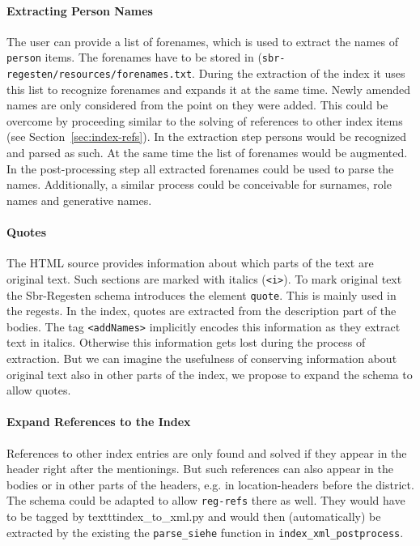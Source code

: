 \paragraph{Extracting Person Names}
The user can provide a list of forenames, which is used to extract the names of \texttt{person} items. The forenames have to be stored in (\texttt{sbr-regesten/resources/forenames.txt}. During the extraction of the index it uses this list to recognize forenames and expands it at the same time. Newly amended names are only considered from the point on they were added. This could be overcome by proceeding similar to the solving of references to other index items (see Section~\ref{sec:index-refs}). In the extraction step persons would be recognized and parsed as such. At the same time the list of forenames would be augmented. In the post-processing step all extracted forenames could be used to parse the names. Additionally, a similar process could be conceivable for surnames, role names and generative names.

\paragraph{Quotes}
The HTML source provides information about which parts of the text are original text. Such sections are marked with italics (\texttt{<i>}). To mark original text the Sbr-Regesten schema introduces the element \texttt{quote}. This is mainly used in the regests. In the index, quotes are extracted from the description part of the bodies. The tag \texttt{<addNames>} implicitly encodes this information as they extract text in italics. Otherwise this information gets lost during the process of extraction. But we can imagine the usefulness of conserving information about original text also in other parts of the index, we propose to expand the schema to allow quotes.

\paragraph{Expand References to the Index}
References to other index entries are only found and solved if they appear in the header right after the mentionings. But such references can also appear in the bodies or in other parts of the headers, e.g. in location-headers before the district. The schema could be adapted to allow \texttt{reg-refs} there as well. They would have to be tagged by texttt{index\_to\_xml.py} and would then (automatically) be extracted by the existing the \texttt{parse\_siehe} function in \texttt{index\_xml\_postprocess}.

